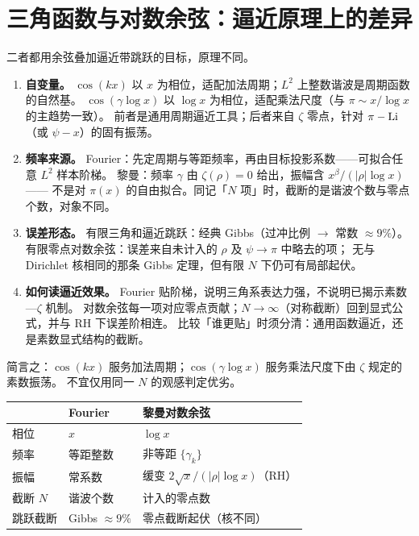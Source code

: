 \section{三角函数与对数余弦：逼近原理上的差异}

二者都用余弦叠加逼近带跳跃的目标，原理不同。

\begin{enumerate}
  \item \textbf{自变量。}
  $\cos(kx)$ 以 $x$ 为相位，适配加法周期；$L^2$ 上整数谐波是周期函数的自然基。
  $\cos(\gamma\log x)$ 以 $\log x$ 为相位，适配乘法尺度（与 $\pi\sim x/\log x$ 的主趋势一致）。
  前者是通用周期逼近工具；后者来自 $\zeta$ 零点，针对 $\pi-\operatorname{Li}$（或 $\psi-x$）的固有振荡。

  \item \textbf{频率来源。}
  Fourier：先定周期与等距频率，再由目标投影系数——可拟合任意 $L^2$ 样本阶梯。
  黎曼：频率 $\gamma$ 由 $\zeta(\rho)=0$ 给出，振幅含 $x^{\beta}/(|\rho|\log x)$——
  不是对 $\pi(x)$ 的自由拟合。同记「$N$ 项」时，截断的是谐波个数与零点个数，对象不同。

  \item \textbf{误差形态。}
  有限三角和逼近跳跃：经典 Gibbs（过冲比例 $\to$ 常数 $\approx 9\%$）。
  有限零点对数余弦：误差来自未计入的 $\rho$ 及 $\psi\to\pi$ 中略去的项；
  无与 Dirichlet 核相同的那条 Gibbs 定理，但有限 $N$ 下仍可有局部起伏。

  \item \textbf{如何读逼近效果。}
  Fourier 贴阶梯，说明三角系表达力强，不说明已揭示素数—$\zeta$ 机制。
  对数余弦每一项对应零点贡献；$N\to\infty$（对称截断）回到显式公式，并与 RH 下误差阶相连。
  比较「谁更贴」时须分清：通用函数逼近，还是素数显式结构的截断。
\end{enumerate}

简言之：$\cos(kx)$ 服务加法周期；$\cos(\gamma\log x)$ 服务乘法尺度下由 $\zeta$ 规定的素数振荡。
不宜仅用同一 $N$ 的观感判定优劣。

\begin{center}
\renewcommand{\arraystretch}{1.5}
\begin{tabular}{|p{2.8cm}|p{5.2cm}|p{5.5cm}|}
\hline
 & \textbf{Fourier} & \textbf{黎曼对数余弦} \\
\hline
相位 & $x$ & $\log x$ \\
\hline
频率 & 等距整数 & 非等距 $\{\gamma_k\}$ \\
\hline
振幅 & 常系数 & 缓变 $2\sqrt{x}/(|\rho|\log x)$（RH） \\
\hline
截断 $N$ & 谐波个数 & 计入的零点数 \\
\hline
跳跃截断 & Gibbs $\approx 9\%$ & 零点截断起伏（核不同） \\
\hline
\end{tabular}
\end{center}

